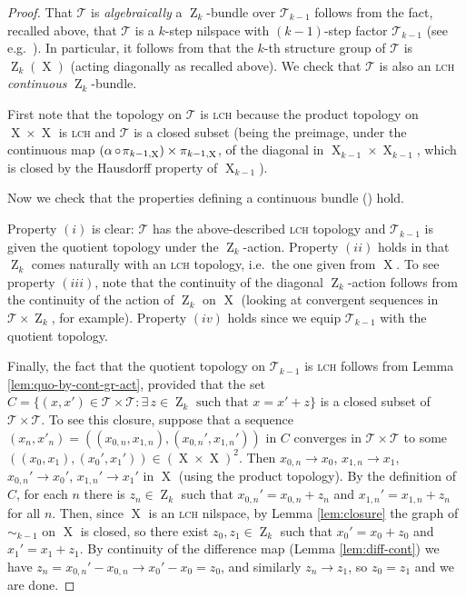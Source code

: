 \documentclass[a4paper,12pt,reqno]{amsart}
\theoremstyle{definition}
\def\to{\rightarrow}
\newcommand{\mc}{\mathcal}
\DeclareMathOperator{\ab}{Z}
\DeclareMathOperator{\ns}{X}
\DeclareMathOperator{\co}{\circ\hspace{-0.02 cm}}
\begin{document}
\begin{proof}
That $\mc{T}$ is \emph{algebraically} a $\ab_k$-bundle over $\mc{T}_{k-1}$  follows from the fact, recalled above, that $\mc{T}$ is a $k$-step nilspace with $(k-1)$-step factor $\mc{T}_{k-1}$ (see e.g.\  \cite[Lemma 3.3.35]{Cand:Notes1}). In particular, it follows from \cite[Proposition 3.3.36]{Cand:Notes1} that the $k$-th structure group of $\mc{T}$ is $\ab_k(\ns)$ (acting diagonally as recalled above). We check that $\mc{T}$ is also an \textsc{lch} \emph{continuous} $\ab_k$-bundle.

First note that the topology on $\mc{T}$ is \textsc{lch} because the product topology on $\ns\times \ns$ is \textsc{lch} and $\mc{T}$ is a closed subset (being the preimage, under the continuous map $(\alpha\co \pi_{k-1,\ns}) \times \pi_{k-1,\ns}$, of the diagonal in $\ns_{k-1}\times\ns_{k-1}$, which is closed by the Hausdorff property of $\ns_{k-1}$).  

Now we check that the properties defining a continuous bundle (\cite[Definition 2.1.6]{Cand:Notes2}) hold.

Property $(i)$ is clear: $\mc{T}$ has the above-described \textsc{lch} topology and $\mc{T}_{k-1}$ is given the quotient topology under the $\ab_k$-action. Property $(ii)$ holds in that $\ab_k$ comes naturally with an \textsc{lch} topology, i.e.\ the one given from $\ns$. To see property $(iii)$, note that the continuity of the diagonal $\ab_k$-action follows from the continuity of the action of $\ab_k$ on $\ns$ (looking at convergent sequences in $\mc{T}\times \ab_k$, for example).
Property $(iv)$ holds since we equip $\mc{T}_{k-1}$ with the quotient topology.

Finally, the fact that the quotient topology on $\mc{T}_{k-1}$ is \textsc{lch} follows from Lemma \ref{lem:quo-by-cont-gr-act}, provided that the set $C=\{(x,x')\in\mc{T}\times\mc{T}: \exists\,z\in \ab_k\textrm{ such that }x=x'+z\}$ is a closed subset of $\mc{T}\times\mc{T}$. To see this closure, suppose that a sequence $(x_n,x'_n)=((x_{0,n},x_{1,n}),(x_{0,n}',x_{1,n}'))$ in $C$ converges in $\mc{T}\times \mc{T}$ to some $((x_0,x_1),(x_0',x_1'))\in (\ns\times\ns)^2$. Then $x_{0,n}\to x_0$, $x_{1,n}\to x_1$, $x_{0,n}'\to x_0'$, $x_{1,n}'\to x_1'$ in $\ns$ (using the product topology). By the definition of $C$, for each $n$ there is $z_n\in \ab_k$ such that $x_{0,n}'=x_{0,n}+z_n$ and $x_{1,n}'=x_{1,n}+z_n$ for all $n$. Then, since $\ns$ is an \textsc{lch} nilspace, by Lemma \ref{lem:closure} the graph of $\sim_{k-1}$ on $\ns$ is closed, so there exist $z_0,z_1\in \ab_k$ such that $x_0'=x_0+z_0$ and $x_1'=x_1+z_1$. By continuity of the difference map (Lemma \ref{lem:diff-cont}) we have $z_n=x_{0,n}'-x_{0,n}\to x_0'-x_0=z_0$, and similarly $z_n\to z_1$, so $z_0=z_1$ and we are done.
\end{proof}
\end{document}
